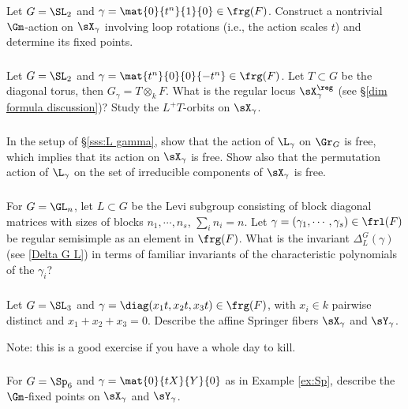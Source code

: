 \subsubsection{} Let $G=\SL_{2}$ and $\gamma=\mat{0}{t^{n}}{1}{0}\in\frg(F)$. Construct a nontrivial $\Gm$-action on $\sX_{\gamma}$ involving loop rotations (i.e., the action scales $t$) and determine its fixed points.

\subsubsection{} Let $G=\SL_{2}$ and $\gamma=\mat{t^{n}}{0}{0}{-t^{n}}\in\frg(F)$. Let $T\subset G$ be the diagonal torus, then $G_{\gamma}=T\otimes_{k}F$. What is the regular locus $\sX^{\reg}_{\gamma}$ (see \S\ref{dim formula discussion})? Study the $L^+T$-orbits on $\sX_{\gamma}$. 

\subsubsection{} In the setup of \S\ref{sss:L gamma}, show that the action of $\L_{\gamma}$ on $\Gr_{G}$ is free, which implies that its action on $\sX_{\gamma}$ is free. Show also that the permutation action of $\L_{\gamma}$ on the set of irreducible components of $\sX_{\gamma}$ is free.


\subsubsection{} For $G=\GL_{n}$, let $L\subset G$ be the Levi subgroup consisting of block diagonal matrices with sizes of blocks $n_{1},\cdots, n_{s}$, $\sum_{i}n_{i}=n$. Let $\gamma=(\gamma_{1},\cdots,\gamma_{s})\in\frl(F)$ be regular semisimple as an element in $\frg(F)$. What is the invariant $\Delta^{G}_{L}(\gamma)$ (see \eqref{Delta G L}) in terms of familiar invariants of the characteristic polynomials of the $\gamma_{i}$?


\subsubsection{}\label{exII:SL3} Let $G=\SL_{3}$ and $\gamma=\diag(x_{1}t,x_{2}t,x_{3}t)\in\frg(F)$, with $x_{i}\in k$ pairwise distinct and $x_{1}+x_{2}+x_{3}=0$. Describe the affine Springer fibers $\sX_{\gamma}$ and $\sY_{\gamma}$.

Note: this is a good exercise if you have a whole day to kill.

\subsubsection{} For $G=\Sp_{6}$ and $\gamma=\mat{0}{tX}{Y}{0}$ as in Example \ref{ex:Sp}, describe the $\Gm$-fixed points on $\sX_{\gamma}$ and $\sY_{\gamma}$. 




